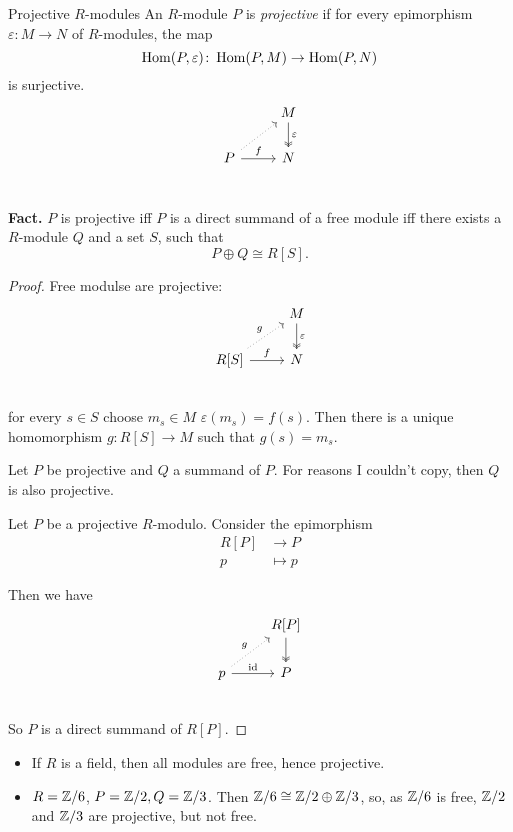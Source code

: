 \documentclass[language=english]{TemplateLecture}
\begin{document}
\begin{defi}{Projective \(R\)-modules}{}
    An \(R\)-module \(P\) is \emph{projective} if for every epimorphism \(\varepsilon \colon M\to N\) of \(R\)-modules, the map
    \[\operatorname{Hom}(P, \varepsilon) \colon \operatorname{Hom}(P, M) \to \operatorname{Hom}(P, N)\]
    is surjective.
    \[\begin{tikzcd}
        & M \ar[d, "\varepsilon", two heads] \\
        P \ar[ru, dotted] \ar[r, "f"] & N \\
    \end{tikzcd}\]
\end{defi}

\textbf{Fact.} \(P\) is projective iff \(P\) is a direct summand of a free module iff there exists a \(R\)-module \(Q\) and a set \(S\), such that
\[P \oplus Q \cong R[S].\]

\begin{proof}
    Free modulse are projective:
    \[\begin{tikzcd}
        & M \ar[d, "\varepsilon", two heads] \\
        R[S] \ar[r, "f"] \ar[ru, dotted, "g"] & N \\
    \end{tikzcd}\]
    for every \(s \in S\) choose \(m_s \in M\) \(\varepsilon(m_s) = f(s)\). Then there is a unique homomorphism \(g\colon R[S] \to M\) such that \(g(s) = m_s\).
    
    Let \(P\) be projective and \(Q\) a summand of \(P\). For reasons I couldn't copy, then \(Q\) is also projective.

Let \(P\) be a projective \(R\)-modulo. Consider the epimorphism
\[\begin{split}
    R[P ] &\to P \\
    p &\mapsto p
\end{split}\]

Then we have
\[\begin{tikzcd}
    & R[P] \ar[d, two heads] \\
    p \ar[ru, dotted, "g"] \ar[r, "\id"] & P \\
\end{tikzcd}\]
So \(P\) is a direct summand of \(R[P]\).

\end{proof}

\begin{itemize}
    \item If \(R\) is a field, then all modules are free, hence projective.
    \item \(R = \mathbb{Z}/6\), \(P = \mathbb{Z}/2, Q = \mathbb{Z}/3\). Then \(\mathbb{Z}/6 \cong \mathbb{Z}/2\oplus \mathbb{Z}/3\), so, as \(\mathbb{Z}/6\) is free, \(\mathbb{Z}/2\) and \( \mathbb{Z}/3\) are projective, but not free.
\end{itemize}
\end{document}
